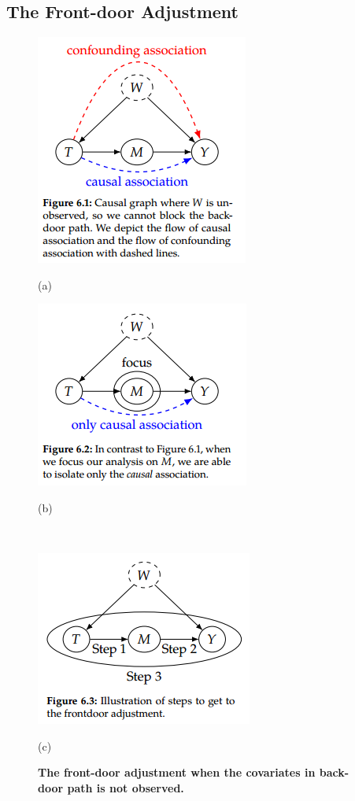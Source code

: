 \documentclass[11pt]{article}
\begin{document}
\subsection{The Front-door Adjustment}
\begin{figure}
\begin{minipage}[t]{0.5\linewidth}
  \centering
  \centerline{\includegraphics[scale = 0.6]{front_door_1.png}}
  \vspace{-5pt}
  \centerline{(a)}
\end{minipage}
\begin{minipage}[t]{0.5\linewidth}
  \centering
  \centerline{\includegraphics[scale = 0.6]{front_door_2.png}}
  \vspace{-5pt}
  \centerline{(b)}
\end{minipage}\\
\begin{minipage}[t]{0.5\linewidth}
  \centering
  \centerline{\includegraphics[scale = 0.6]{front_door_3.png}}
  \vspace{-5pt}
  \centerline{(c)}
\end{minipage}
\caption{\footnotesize{\textbf{The front-door adjustment when the covariates in back-door path is not observed. }}}
\label{fig: front_door}
\end{figure}
\end{document}
